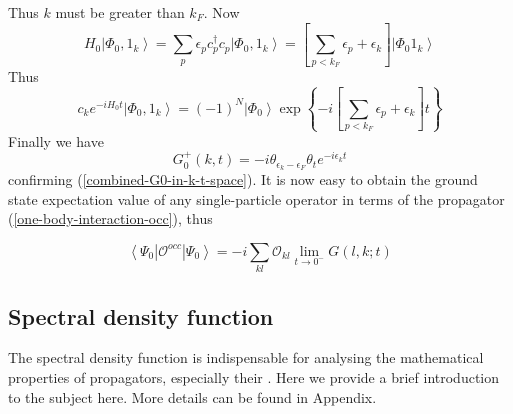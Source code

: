 Thus $k$ must be greater than $k_F$. Now
\begin{equation}H_{0}\left|\Phi_{0}, 1_{k}\right\rangle=\sum_{p} \epsilon_{p} c_{p}^{\dagger} c_{p}\left|\Phi_{0}, 1_{k}\right\rangle=\left[\sum_{p<k_{F}} \epsilon_{p}+\epsilon_{k}\right]\left|\Phi_{0} 1_{k}\right\rangle\end{equation}
Thus
\begin{equation}c_{k} e^{-i H_{0} t}\left|\Phi_{0}, 1_{k}\right\rangle=(-1)^{N}\left|\Phi_{0}\right\rangle \exp \left\{-i\left[\sum_{p<k_{F}} \epsilon_{p}+\epsilon_{k}\right] t\right\}\end{equation}
Finally we have
\begin{equation}G_{0}^{+}(k, t)=-i \theta_{\epsilon_k-\epsilon_F} \theta_{t} e^{-i \epsilon_k t}\end{equation}
confirming (\ref{combined-G0-in-k-t-space}). It is now easy to obtain the ground state expectation value of any single-particle operator in terms of the propagator (\ref{one-body-interaction-occ}), thus
\begin{imp}
\begin{equation}\left\langle\Psi_{0}\left|\mathcal{O}^{o c c}\right| \Psi_{0}\right\rangle=-i \sum_{k l} \mathcal{O}_{k l} \lim _{t \rightarrow 0^{-}} G(l, k ; t)\end{equation}
\end{imp}
\subsection{Spectral density function}
The spectral density function is indispensable for analysing the mathematical properties of propagators, especially their . Here we provide a brief introduction to the subject here. More details can be found in Appendix.

